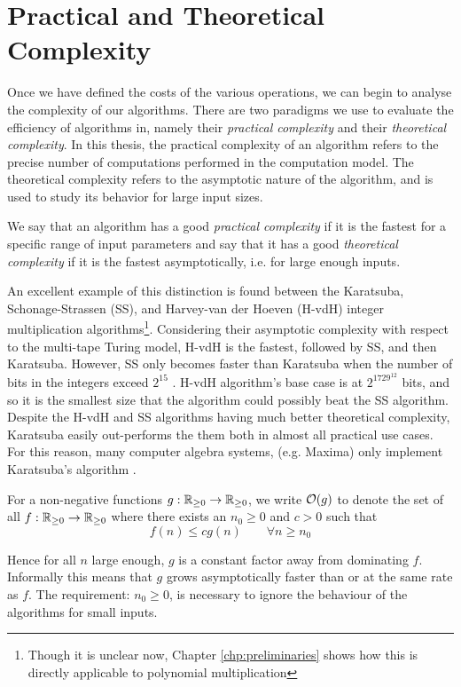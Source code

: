 \section{Practical and Theoretical Complexity}%
\label{sec:Practical and Theoretical Complexity}

Once we have defined the costs of the various operations, we can begin to analyse the complexity of our algorithms. There are two paradigms we use to evaluate the efficiency of algorithms in, namely their \emph{practical complexity} and their \emph{theoretical complexity}. In this thesis, the practical complexity of an algorithm refers to the precise number of computations performed in the computation model. The theoretical complexity refers to the asymptotic nature of the algorithm, and is used to study its behavior for large input sizes.

We say that an algorithm has a good \textit{practical complexity} if it is the fastest for a specific range of input parameters and say that it has a good \textit{theoretical complexity} if it is the fastest asymptotically, i.e. for large enough inputs.

An excellent example of this distinction is found between the Karatsuba, Schonage-Strassen (SS), and Harvey-van der Hoeven (H-vdH) integer multiplication algorithms\footnote{Though it is unclear now, Chapter \ref{chp:preliminaries} shows how this is directly applicable to polynomial multiplication}. Considering their asymptotic complexity with respect to the multi-tape Turing model, H-vdH is the fastest, followed by SS, and then Karatsuba. However, SS only becomes faster than Karatsuba when the number of bits in the integers exceed $2^{15}$ \cite{magma-archive}. H-vdH algorithm's base case is at $2^{1729^{12}}$ bits, and so it is the smallest size that the algorithm could possibly beat the SS algorithm. Despite the H-vdH and SS algorithms having much better theoretical complexity, Karatsuba easily out-performs the them both in almost all practical use cases. For this reason, many computer algebra systems, (e.g. Maxima) only implement Karatsuba's algorithm \cite{maxima-karatsuba}.

\begin{definition}
    For a non-negative functions $g: {\mathbb R}_{\ge 0} \to {\mathbb R}_{\ge 0}$, we write $\mathcal O(g)$ to denote the set of all $f: {\mathbb R}_{\ge 0} \to {\mathbb R}_{\ge 0}$ where there exists an $n_0 \ge 0$ and $c > 0$ such that
    \begin{equation}\label{eq:big-o}
        f(n) \le cg(n) \qquad \forall n \ge n_0
    \end{equation}
\end{definition}
Hence for all $n$ large enough, $g$ is a constant factor away from dominating $f$. Informally this means that $g$ grows asymptotically faster than or at the same rate as $f$. The requirement: $n_0 \ge 0$, is necessary to ignore the behaviour of the algorithms for small inputs.

